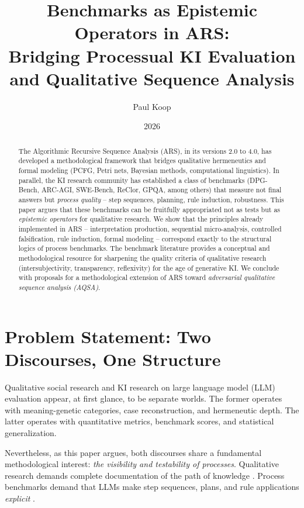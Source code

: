 \documentclass[12pt,a4paper]{article}
\title{Benchmarks as Epistemic Operators in ARS:\\
Bridging Processual KI Evaluation\\
and Qualitative Sequence Analysis}
\author{
  \large
  \begin{tabular}{c}
    Paul Koop
  \end{tabular}
}
\date{\large 2026}
\begin{document}
\maketitle

\begin{abstract}
The Algorithmic Recursive Sequence Analysis (ARS), in its versions 2.0 to 4.0, has developed a methodological framework that bridges qualitative hermeneutics and formal modeling (PCFG, Petri nets, Bayesian methods, computational linguistics). In parallel, the KI research community has established a class of benchmarks (DPG-Bench, ARC-AGI, SWE-Bench, ReClor, GPQA, among others) that measure not final answers but \textit{process quality} – step sequences, planning, rule induction, robustness. This paper argues that these benchmarks can be fruitfully appropriated not as tests but as \textit{epistemic operators} for qualitative research. We show that the principles already implemented in ARS – interpretation production, sequential micro-analysis, controlled falsification, rule induction, formal modeling – correspond exactly to the structural logics of process benchmarks. The benchmark literature provides a conceptual and methodological resource for sharpening the quality criteria of qualitative research (intersubjectivity, transparency, reflexivity) for the age of generative KI. We conclude with proposals for a methodological extension of ARS toward \textit{adversarial qualitative sequence analysis (AQSA)}.
\end{abstract}

\section{Problem Statement: Two Discourses, One Structure}

Qualitative social research and KI research on large language model (LLM) evaluation appear, at first glance, to be separate worlds. The former operates with meaning-genetic categories, case reconstruction, and hermeneutic depth. The latter operates with quantitative metrics, benchmark scores, and statistical generalization.

Nevertheless, as this paper argues, both discourses share a fundamental methodological interest: \textit{the visibility and testability of processes}. Qualitative research demands complete documentation of the path of knowledge \cite{steinke2004quality}. Process benchmarks demand that LLMs make step sequences, plans, and rule applications \textit{explicit} \cite{chollet2019measure, zhong2024dpg}.
\end{document}
